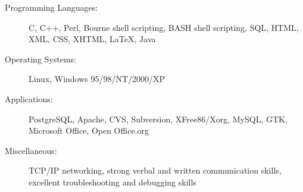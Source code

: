 \documentclass[11pt]{article}
\begin{document}
\begin{description}
\item[Programming Languages:]
C, C++, Perl, Bourne shell scripting, BASH shell scripting, SQL, HTML, XML, CSS, XHTML, \LaTeX, Java
\item[Operating Systems:]
Linux, Windows 95/98/NT/2000/XP
\item[Applications:]
PostgreSQL, Apache, CVS, Subversion, XFree86/Xorg, MySQL, GTK, Microsoft Office, Open Office.org
\item[Miscellaneous:]
TCP/IP networking, strong verbal and written communication skills, excellent troubleshooting and debugging skills
\end{description}
\end{document}

